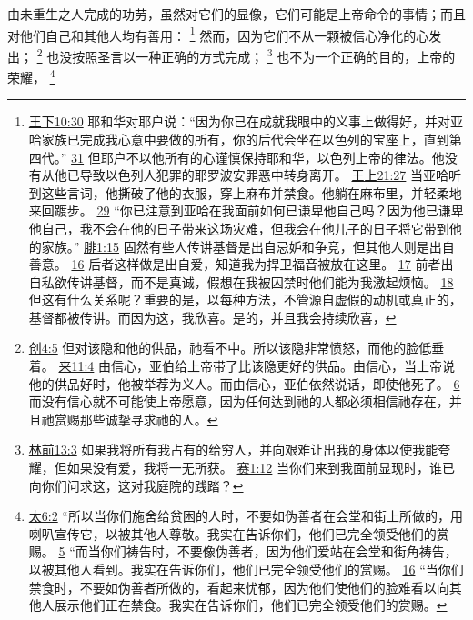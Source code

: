 \documentclass[12pt, a4paper, oneside]{ctexart}
\newcounter{parnum}[section]
\newcommand{\N}{%
   \noindent\refstepcounter{parnum}%
    \makebox[\parindent][l]{\textbf{\arabic{parnum}.}}}
\begin{document}
\N 由未重生之人完成的功劳，虽然对它们的显像，它们可能是上帝命令的事情；而且对他们自己和其他人均有善用：
	\footnote {
		\href{https://biblehub.com/2_kings/10-30.htm}{王下10:30} 耶和华对耶户说：“因为你已在成就我眼中的义事上做得好，并对亚哈家族已完成我心意中要做的所有，你的后代会坐在以色列的宝座上，直到第四代。”
		\href{https://biblehub.com/2_kings/10-31.htm}{31} 但耶户不以他所有的心谨慎保持耶和华，以色列上帝的律法。他没有从他已导致以色列人犯罪的耶罗波安罪恶中转身离开。
		\href{https://biblehub.com/1_kings/21-27.htm}{王上21:27} 当亚哈听到这些言词，他撕破了他的衣服，穿上麻布并禁食。他躺在麻布里，并轻柔地来回踱步。
		\href{https://biblehub.com/1_kings/21-29.htm}{29} “你已注意到亚哈在我面前如何已谦卑他自己吗？因为他已谦卑他自己，我不会在他的日子带来这场灾难，但我会在他儿子的日子将它带到他的家族。”
		\href{https://biblehub.com/philippians/1-15.htm}{腓1:15} 固然有些人传讲基督是出自忌妒和争竞，但其他人则是出自善意。
		\href{https://biblehub.com/philippians/1-16.htm}{16} 后者这样做是出自爱，知道我为捍卫福音被放在这里。
		\href{https://biblehub.com/philippians/1-17.htm}{17} 前者出自私欲传讲基督，而不是真诚，假想在我被囚禁时他们能为我激起烦恼。
		\href{https://biblehub.com/philippians/1-18.htm}{18} 但这有什么关系呢？重要的是，以每种方法，不管源自虚假的动机或真正的，基督都被传讲。而因为这，我欣喜。是的，并且我会持续欣喜，
	}
	然而，因为它们不从一颗被信心净化的心发出；
	\footnote {
		\href{https://biblehub.com/genesis/4-5.htm}{创4:5} 但对该隐和他的供品，祂看不中。所以该隐非常愤怒，而他的脸低垂着。
		\href{https://biblehub.com/hebrews/11-4.htm}{来11:4} 由信心，亚伯给上帝带了比该隐更好的供品。由信心，当上帝说他的供品好时，他被举荐为义人。而由信心，亚伯依然说话，即使他死了。
		\href{https://biblehub.com/hebrews/11-6.htm}{6} 而没有信心就不可能使上帝愿意，因为任何达到祂的人都必须相信祂存在，并且祂赏赐那些诚挚寻求祂的人。
	}
	也没按照圣言以一种正确的方式完成；
	\footnote {
		\href{https://biblehub.com/1_corinthians/13-3.htm}{林前13:3} 如果我将所有我占有的给穷人，并向艰难让出我的身体以使我能夸耀，但如果没有爱，我将一无所获。
		\href{https://biblehub.com/isaiah/1-12.htm}{赛1:12} 当你们来到我面前显现时，谁已向你们问求这，这对我庭院的践踏？
	}
	也不为一个正确的目的，上帝的荣耀，
	\footnote {
		\href{https://biblehub.com/matthew/6-2.htm}{太6:2} “所以当你们施舍给贫困的人时，不要如伪善者在会堂和街上所做的，用喇叭宣传它，以被其他人尊敬。我实在告诉你们，他们已完全领受他们的赏赐。
		\href{https://biblehub.com/matthew/6-5.htm}{5} “而当你们祷告时，不要像伪善者，因为他们爱站在会堂和街角祷告，以被其他人看到。我实在告诉你们，他们已完全领受他们的赏赐。
		\href{https://biblehub.com/matthew/6-16.htm}{16} “当你们禁食时，不要如伪善者所做的，看起来忧郁，因为他们使他们的脸难看以向其他人展示他们正在禁食。我实在告诉你们，他们已完全领受他们的赏赐。
	}
\end{document}
